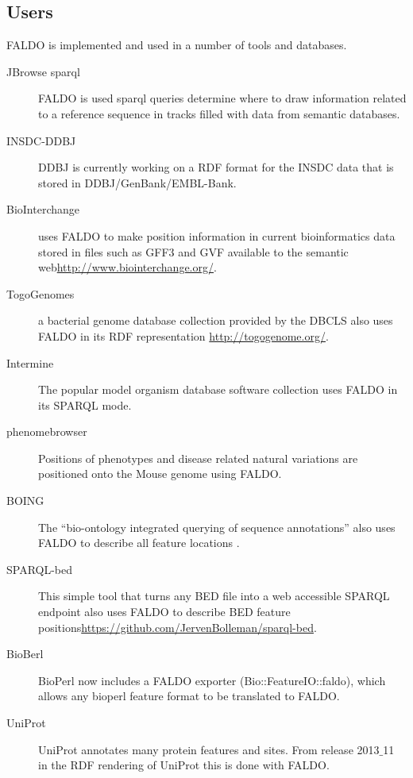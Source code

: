 \subsection*{Users}
FALDO is implemented and used in a number of tools and databases.

\begin{description}
\item[JBrowse sparql] FALDO is used sparql queries determine where to draw information related to a reference sequence in tracks filled with data from semantic databases. 
\item[INSDC-DDBJ] DDBJ is currently working on a RDF format for the INSDC data that is stored in DDBJ/GenBank/EMBL-Bank.
\item[BioInterchange] uses FALDO to make position information in current bioinformatics data stored in files such as GFF3 and GVF available to the semantic web\url{http://www.biointerchange.org/}.
\item[TogoGenomes] a bacterial genome database collection provided by the DBCLS also uses FALDO in its RDF representation \url{http://togogenome.org/}.
\item[Intermine] The popular model organism database software collection uses FALDO in its SPARQL mode.
\item[phenomebrowser] Positions of phenotypes and disease related natural variations are positioned onto the Mouse genome using FALDO.
\item[BOING] The ``bio-ontology integrated querying of sequence annotations'' also uses FALDO to describe all feature locations \cite{BOING}.
\item[SPARQL-bed] This simple tool that turns any BED file into a web accessible SPARQL endpoint also uses FALDO to describe BED feature positions\url{https://github.com/JervenBolleman/sparql-bed}.
\item[BioBerl] BioPerl\cite{BioPerl2002} now includes a FALDO exporter (Bio::FeatureIO::faldo), which allows any bioperl feature format to be translated to FALDO.
\item[UniProt] UniProt annotates many protein features and sites. From release 2013$\_$11 in the RDF rendering of UniProt this is done with FALDO.
\end{description}


